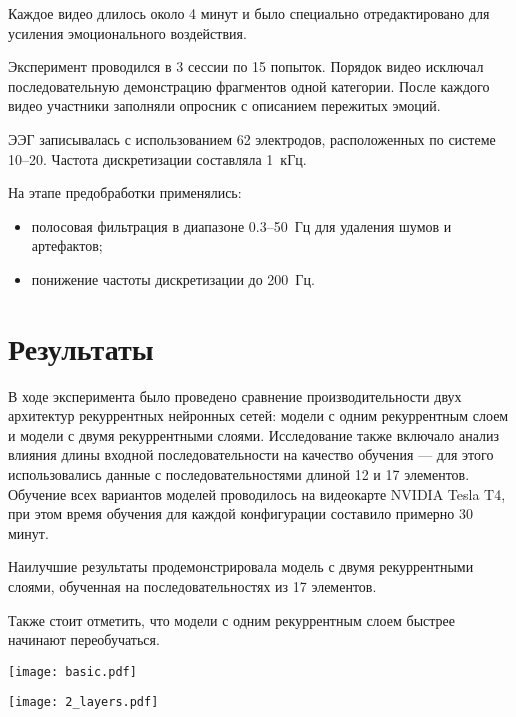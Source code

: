\documentclass[12pt, twoside]{article}
\begin{document}
Каждое видео длилось около 4 минут и было специально отредактировано для усиления эмоционального воздействия.

Эксперимент проводился в 3 сессии по 15 попыток. Порядок видео исключал последовательную демонстрацию фрагментов одной категории. После каждого видео участники заполняли опросник с описанием пережитых эмоций.

ЭЭГ записывалась с использованием 62 электродов, расположенных по системе 10--20. Частота дискретизации составляла 1~кГц.

На этапе предобработки применялись:
\begin{itemize}
    \item полосовая фильтрация в диапазоне 0.3--50~Гц для удаления шумов и артефактов;
    \item понижение частоты дискретизации до 200~Гц.
\end{itemize}

\section{Результаты}

В ходе эксперимента было проведено сравнение производительности двух архитектур рекуррентных нейронных сетей: модели с одним рекуррентным слоем и модели с двумя рекуррентными слоями. Исследование также включало анализ влияния длины входной последовательности на качество обучения — для этого использовались данные с последовательностями длиной 12 и 17 элементов. Обучение всех вариантов моделей проводилось на видеокарте NVIDIA Tesla T4, при этом время обучения для каждой конфигурации составило примерно 30 минут.

Наилучшие результаты продемонстрировала модель с двумя рекуррентными слоями, обученная на последовательностях из 17 элементов.

Также стоит отметить, что модели с одним рекуррентным слоем быстрее начинают переобучаться.

\begin{center}
\texttt{[image: basic.pdf]}
\end{center}

\begin{center}
\texttt{[image: 2\_layers.pdf]}
\end{center}
\end{document}
